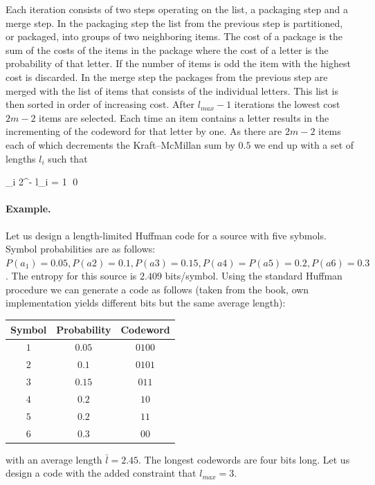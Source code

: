 Each iteration consists of two steps operating on the list, a packaging step and a merge step. In the packaging step the list from the previous step is partitioned, or packaged, into groups of two neighboring items. The cost of a package is the sum of the costs of the items in the package where the cost of a letter is the probability of that letter. If the number of items is odd the item with the highest cost is discarded. In the merge step the packages from the previous step are merged with the list of items that consists of the individual letters. This list is then sorted in order of increasing cost. After $l_{max} - 1$ iterations the lowest cost $2m - 2$ items are selected. Each time an item contains a letter results in the incrementing of the codeword for that letter by one. As there are $2m-2$ items each of which decrements the Kraft–McMillan sum by $0.5$ we end up with a set of lengths $l_i$ such that

\bee
\sum_i 2^{- l_i} = 1 \qed
\eee

\paragraph{Example.} Let us design a length-limited Huffman code for a source with five sybmols. Symbol probabilities are as follows: $P(a_1) = 0.05, P(a2) = 0.1, P(a3) = 0.15, P(a4) = P(a5) = 0.2, P(a6) = 0.3$. The entropy for this source is $2.409$ bits/symbol. Using the standard Huffman procedure we can generate a code 
as follows (taken from the book, own implementation yields different bits but the same average length):

\vspace{3mm}

\begin{tabular}{cc|c}
    Symbol & Probability & Codeword \\ \hline
    $1$ & $0.05$ & $0100$ \\
    $2$ & $0.1$ & $0101$ \\
    $3$ & $0.15$ & $011$ \\
    $4$ & $0.2$ & $10$ \\
    $5$ & $0.2$ & $11$ \\
    $6$ & $0.3$ & $00$
\end{tabular}

\vspace{3mm}

with an average length $\bar{l} = 2.45$. The longest codewords are four bits long. Let us design a code with the added constraint that $l_{max} = 3$.


